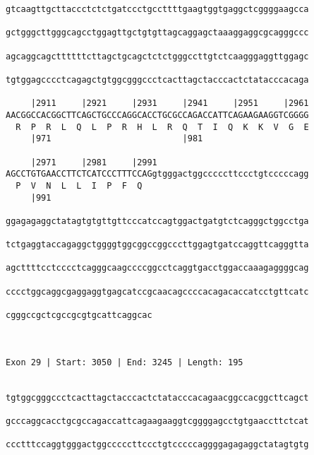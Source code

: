 \documentclass{article}
\begin{document}
\begin{Verbatim}
gtcaagttgcttaccctctctgatccctgccttttgaagtggtgaggctcggggaagcca
                                                            
gctgggcttgggcagcctggagttgctgtgttagcaggagctaaaggaggcgcagggccc
                                                            
agcaggcagcttttttcttagctgcagctctctgggccttgtctcaagggaggttggagc
                                                            
tgtggagcccctcagagctgtggcgggccctcacttagctacccactctatacccacaga
                                                            
     |2911     |2921     |2931     |2941     |2951     |2961
AACGGCCACGGCTTCAGCTGCCCAGGCACCTGCGCCAGACCATTCAGAAGAAGGTCGGGG
  R  P  R  L  Q  L  P  R  H  L  R  Q  T  I  Q  K  K  V  G  E
     |971                          |981                     
  
     |2971     |2981     |2991                              
AGCCTGTGAACCTTCTCATCCCTTTCCAGgtgggactggcccccttccctgtcccccagg
  P  V  N  L  L  I  P  F  Q                                 
     |991                                                   
  
ggagagaggctatagtgtgttgttcccatccagtggactgatgtctcagggctggcctga
                                                            
tctgaggtaccagaggctggggtggcggccggcccttggagtgatccaggttcagggtta
                                                            
agcttttcctcccctcagggcaagccccggcctcaggtgacctggaccaaagaggggcag
                                                            
cccctggcaggcgaggaggtgagcatccgcaacagccccacagacaccatcctgttcatc
                                                            
cgggccgctcgccgcgtgcattcaggcac
                             
                             
 
Exon 29 | Start: 3050 | End: 3245 | Length: 195


tgtggcgggccctcacttagctacccactctatacccacagaacggccacggcttcagct
                                                            
gcccaggcacctgcgccagaccattcagaagaaggtcggggagcctgtgaaccttctcat
                                                            
ccctttccaggtgggactggcccccttccctgtcccccaggggagagaggctatagtgtg
                                                            

\end{Verbatim}
\end{document}
